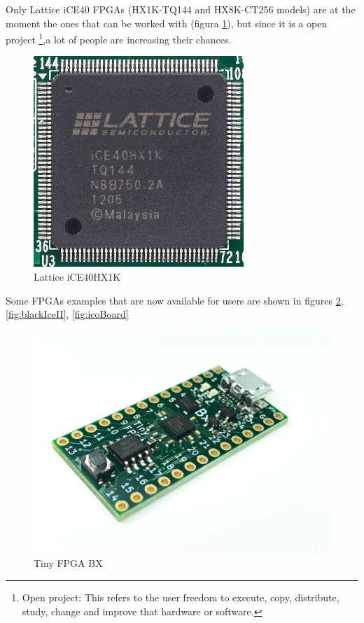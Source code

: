 Only Lattice iCE40 FPGAs (HX1K-TQ144 and HX8K-CT256 models) are at the moment the ones that can be worked with (figura \ref{fig:lattice}), but since it is a open project \footnote{Open project: This refers to the user freedom to execute, copy, distribute, study, change and improve that hardware or software.},a lot of people are increasing their chances.
\begin{center}
	\begin{figure}[H]
		\center
		\includegraphics[trim = 0mm 0mm 0mm 0mm, clip,scale=0.4]{imagenes/EstadoArte/lattice.png}
		\caption{Lattice iCE40HX1K}
		\label{fig:lattice}
	\end{figure}
\end{center}
\newpage
Some FPGAs examples that are now available for users are shown in figures \ref{fig:tiny_fpga}, \ref{fig:blackIceII}, \ref{fig:icoBoard}
\begin{center}
	\begin{figure}[H]
		\center
		\includegraphics[trim = 0mm 0mm 0mm 0mm, clip,scale=0.15]{imagenes/EstadoArte/tinyFPGABX.jpg}
		\caption{Tiny FPGA BX}
		\label{fig:tiny_fpga}
	\end{figure}
\end{center}
